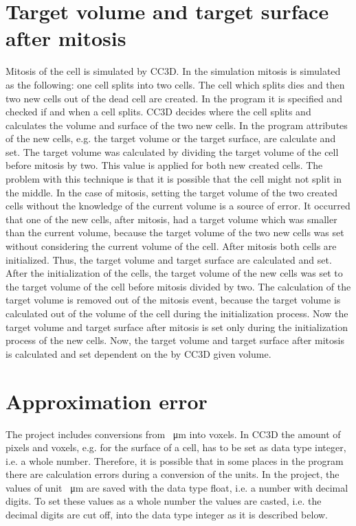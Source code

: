 \section{Target volume and target surface after mitosis} \label{sec:TargetVolumeSurfaceAfterMitosis}
Mitosis of the cell is simulated by \ac{CC3D}. In the simulation mitosis is simulated as the following: one cell splits into two cells. The cell which splits dies and then two new cells out of the dead cell are created. \newline
In the program it is specified and checked if and when a cell splits. \ac{CC3D} decides where the cell splits and calculates the volume and surface of the two new cells. In the program attributes of the new cells, e.g. the target volume or the target surface, are calculate and set. \newline 
The target volume was calculated by dividing the target volume of the cell before mitosis by two. This value is applied for both new created cells. The problem with this technique is that it is possible that the cell might not split in the middle. In the case of mitosis, setting the target volume of the two created cells without the knowledge of the current volume is a source of error. It occurred that one of the new cells, after mitosis, had a target volume which was smaller than the current volume,  because the target volume of the two new cells was set without considering the current volume of the cell. \newline
After mitosis both cells are initialized. Thus, the target volume and target surface are calculated and set. After the initialization of the cells, the target volume of the new cells was set to the target volume of the cell before mitosis divided by two. \newline
The calculation of the target volume is removed out of the mitosis event, because the target volume is calculated out of the volume of the cell during the initialization process.  Now the target volume and target surface after mitosis is set only during the initialization process of the new cells. \newline
Now, the target volume and target surface after mitosis is calculated and set dependent on the by \ac{CC3D} given volume.


\section{Approximation error} \label{sec:ApproximationError}
The project includes conversions from \SI{}{\micro\metre} into voxels. In \ac{CC3D} the amount of pixels and voxels, e.g. for the surface of a cell, has to be set as data type integer, i.e. a whole number. Therefore, it is possible that in some places in the program there are calculation errors during a conversion of the units. In the project, the values of unit \SI{}{\micro\metre} are saved with the data type float, i.e. a number with decimal digits. To set these values as a whole number the values are casted, i.e. the decimal digits are cut off, into the data type integer as it is described below. 

